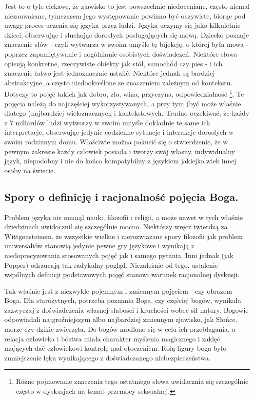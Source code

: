 \documentclass{article}
\begin{document}
Jest to o tyle ciekawe, że zjawisko to jest powszechnie niedoceniane, często niemal niezauważane, tymczasem jego występowanie powinno być oczywiste, biorąc pod uwagę proces uczenia się języka przez ludzi. Języka uczymy się jako kilkuletnie dzieci, obserwując i słuchając dorosłych posługujących się mową. Dziecko poznaje znaczenie słów - czyli wytwarza w swoim umyśle tę bijekcję, o której była mowa - poprzez zapamiętywanie i uogólnianie osobistych doświadczeń. Niektóre słowa opisują konkretne, rzeczywiste obiekty jak stół, samochód czy pies - i ich znaczenie łatwo jest jednoznacznie ustalić. Niektóre jednak są bardziej abstrakcyjne, a często niedookreślone ze znaczeniem zależnym od kontekstu. Dotyczy to pojęć takich jak dobro, zło, wina, przyczyna, odpowiedzialność \footnote{Różne pojmowanie znaczenia tego ostatniego słowa uwidacznia się szczególnie często w dyskusjach na temat przemocy seksualnej. }. Te pojęcia należą do najczęściej wykorzystywanych, a przy tym (być może właśnie dlatego )najbardziej wieloznacznych i kontekstowych. Trudno oczekiwać, że każdy z 7 miliardów ludzi wytworzy w swoim umyśle dokładnie te same ich interpretacje, obserwując jedynie codzienne sytuacje i interakcje dorosłych w swoim rodzinnym domu. Właściwie można pokusić się o stwierdzenie, że w pewnym zakresie każdy człowiek posiada i tworzy swój własny, indywidualny język, niepodobny i nie do końca kompatybilny z językiem jakiejkolwiek innej osoby na świecie. 

\subsection{Spory o definicję i racjonalność pojęcia Boga. } \label{sec:god-def}

Problem języka nie ominął nauki, filozofii i religii, a może nawet w tych właśnie dziedzinach uwidocznił się szczególnie mocno. Niektórzy wręcz twierdzą za Wittgensteinem, że wszystkie wielkie i nierozwiązane spory filozofii jak problem uniwersaliów stanowią jedynie pewne gry językowe i wynikają z niedoprecyzowania stosowanych pojęć jak i samego pytania. Inni jednak (jak Popper) odrzucają tak radykalny pogląd. Niezależnie od tego, ustalenie wspólnych definicji podstawowych pojęć stanowi warunek racjonalnej dyskusji. 

Tak właśnie jest z niezwykle pojemnym i zmiennym pojęciem - czy obrazem - Boga. Dla starożytnych, potrzeba poznania Boga, czy częściej bogów, wynikała zazwyczaj z doświadczenia własnej słabości i kruchości wobec sił natury. Bogowie odpowiadali najgroźniejszym albo najbardziej zmiennym zjawisko, jak Słońce, morze czy dzikie zwierzęta. Do bogów modlono się w celu ich przebłagania, a relacja człowieka i bóstwa miała charakter myślenia magicznego i zaklęć mających dać człowiekowi kontrolę nad otoczeniem. Rolą figury boga było zmniejszenie lęku wynikającego z doświadczanego niebezpieczeństwa. 
\end{document}
